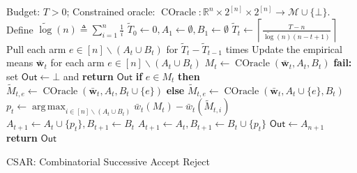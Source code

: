 \documentclass{article}
\newcommand{\AlgorithmBud}{{\small \textsf{CSAR}}\xspace}
\newcommand{\M}{\mathcal M}
\newcommand{\del}{\backslash}
\newcommand{\RR}{\mathbb R}
\DeclareMathOperator*{\argmax}{arg\,max}
\DeclareMathOperator{\COracle}{COracle}
\newcommand{\out}{\mathsf{Out}}
\newcommand{\barlog}{\tilde{\log}}
\renewcommand{\vec}[1]{\boldsymbol{#1}}
\begin{document}
\begin{algorithm}[htbp]
{
\small
\begin{algorithmic}[1]
\Require Budget: $T>0$; Constrained oracle: $\COracle: \RR^n\times 2^{[n]} \times 2^{[n]} \rightarrow \M \cup \{\bot\}$.
\State Define $\barlog(n) \triangleq \sum_{i=1}^n \frac1i$
\State $\tilde T_0 \gets 0, A_1 \gets \emptyset, B_1\gets \emptyset$
	\State $\tilde T_t \gets \left\lceil \frac{T-n}{\barlog(n)(n-t+1)} \right\rceil$
	\State Pull each arm $e\in [n]\del (A_t\cup B_t)$ for $\tilde T_t - \tilde T_{t-1}$ times
	\State Update the empirical means $\vec {\bar w}_t$ for each arm $e\in [n] \del (A_t\cup B_t)$
	\State $M_t \gets \COracle(\vec {\bar w}_t, A_t, B_t)$
    \State \textbf{fail:} set $\out\gets \bot$ and \textbf{return }$\out$
  \EndIf
	\For{\textbf{each} $e \in [n]\del (A_t\cup B_t)$}
		\State \textbf{if } {$e\in M_t$} \textbf{then }  $\tilde M_{t,e} \gets \COracle(\vec {\bar w}_t, A_t, B_t \cup \{e\})$
		\State \textbf{else} $\tilde M_{t,e} \gets \COracle(\vec {\bar w}_t, A_t \cup \{e\}, B_t)$
	\EndFor
	\State $p_t \gets \argmax_{i\in[n]\del (A_t\cup B_t)} \bar w_t(M_t) - \bar w_t(\tilde M_{t,i})$
		\State $A_{t+1} \gets A_t \cup \{p_t\}, B_{t+1} \gets B_t$
	\Else
		\State $A_{t+1} \gets A_t , B_{t+1} \gets B_t \cup \{p_t\}$
	\EndIf
\EndFor
\State $\out\gets A_{n+1}$
\State \textbf{return} $\out$
\end{algorithmic}
\caption{\AlgorithmBud: Combinatorial Successive Accept Reject}
\label{algo:budget}
}
\end{algorithm}
\vspace{-0.5em}
\end{document}

